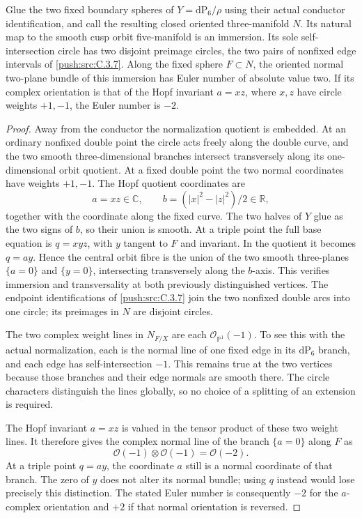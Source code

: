 \begin{proposition}\label{push:src:C.3.11}
Glue the two fixed boundary spheres of \(Y=\mathrm{dP}_6/\rho\)
using their actual conductor identification, and call the resulting
closed oriented three-manifold \(N\). Its natural map to the
smooth cusp orbit five-manifold is an immersion. Its sole
self-intersection circle has two disjoint preimage circles, the
two pairs of nonfixed edge intervals of \ref{push:src:C.3.7}.
Along the fixed sphere \(F\subset N\), the oriented normal
two-plane bundle of this immersion has Euler number of absolute
value two. If its complex orientation is that of the Hopf invariant
\(a=xz\), where \(x,z\) have circle weights \(+1,-1\), the
Euler number is \(-2\).
\end{proposition}
\begin{proof}
Away from the conductor the normalization quotient is embedded.
At an ordinary nonfixed double point the circle acts freely along
the double curve, and the two smooth three-dimensional branches
intersect transversely along its one-dimensional orbit quotient.
At a fixed double point the two normal coordinates have weights
\(+1,-1\). The Hopf quotient coordinates are
\[
 a=xz\in\mathbb C,\qquad
 b=(|x|^2-|z|^2)/2\in\mathbb R,
\]
together with the coordinate along the fixed curve. The two
halves of \(Y\) glue as the two signs of \(b\), so their
union is smooth. At a triple point the full base equation is
\(q=xyz\), with \(y\) tangent to \(F\) and invariant.
In the quotient it becomes \(q=ay\). Hence the central orbit
fibre is the union of the two smooth three-planes
\(\{a=0\}\) and \(\{y=0\}\), intersecting transversely
along the \(b\)-axis. This verifies immersion and transversality
at both previously distinguished vertices. The endpoint
identifications of \ref{push:src:C.3.7} join the two nonfixed double arcs into
one circle; its preimages in \(N\) are disjoint circles.

The two complex weight lines in \(N_{F/X}\) are each
\(\mathcal O_{\mathbb P^1}(-1)\). To see this with the actual
normalization, each is the normal line of one fixed edge in its
\(\mathrm{dP}_6\) branch, and each edge has self-intersection
\(-1\). This remains true at the two vertices because those
branches and their edge normals are smooth there. The circle
characters distinguish the lines globally, so no choice of a
splitting of an extension is required.

The Hopf invariant \(a=xz\) is valued in the tensor product
of these two weight lines. It therefore gives the complex normal
line of the branch \(\{a=0\}\) along \(F\) as
\[
 \mathcal O(-1)\otimes\mathcal O(-1)=\mathcal O(-2).
\]
At a triple point \(q=ay\), the coordinate \(a\) still is
a normal coordinate of that branch. The zero of \(y\) does
not alter its normal bundle; using \(q\) instead would lose
precisely this distinction. The stated Euler number is consequently
\(-2\) for the \(a\)-complex orientation and \(+2\) if that
normal orientation is reversed.


\end{proof}

